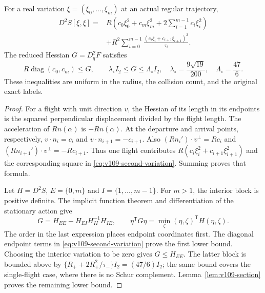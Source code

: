 \begin{lemma}
\label{lem:v109-hessian}
For a real variation $\xi=(\xi_0,\ldots,\xi_m)$ at an actual
regular trajectory,
\begin{equation}\label{eq:v109-second-variation}
 \begin{split}
 D^2S[\xi,\xi]={}&R\left(c_0\xi_0^2+c_m\xi_m^2
                   +2\sum_{i=1}^{m-1}c_i\xi_i^2\right)\\
 &+R^2\sum_{i=0}^{m-1}
                 \frac{(c_i\xi_i+c_{i+1}\xi_{i+1})^2}{\tau_i}.
 \end{split}
\end{equation}
The reduced Hessian $G=D_q^2F$ satisfies
\begin{equation}\label{eq:v109-hessian-bounds}
 R\operatorname{diag}(c_0,c_m)\leq G,\qquad
 \lambda_\circ I_2\leq G\leq\Lambda_\circ I_2,
 \quad \lambda_\circ=\frac{9\sqrt{19}}{200},\quad
 \Lambda_\circ=\frac{47}{6}.
\end{equation}
These inequalities are uniform in the radius, the collision count,
and the original exact labels.
\end{lemma}
\begin{proof}
For a flight with unit direction $v$, the Hessian of its length in
its endpoints is the squared perpendicular displacement divided by
the flight length. The acceleration of $R n(\alpha)$ is $-R n(\alpha)$.
At the departure and arrival points, respectively,
$v\cdot n_i=c_i$ and $v\cdot n_{i+1}=-c_{i+1}$.
Also $(R n_i')\cdot v^\perp=Rc_i$ and
$(R n_{i+1}')\cdot v^\perp=-Rc_{i+1}$.
Thus one flight contributes
$R(c_i\xi_i^2+c_{i+1}\xi_{i+1}^2)$ and the corresponding
square in \eqref{eq:v109-second-variation}. Summing proves that formula.

Let $H=D^2S$, $E=\{0,m\}$ and $I=\{1,\ldots,m-1\}$.
For $m>1$, the interior block is positive definite. The implicit
function theorem and differentiation of the stationary action give
\begin{equation}\label{eq:v109-schur}
 G=H_{EE}-H_{EI}H_{II}^{-1}H_{IE},\qquad
 \eta^{\mathsf T}G\eta=
    \min_{\zeta}(\eta,\zeta)^{\mathsf T}H(\eta,\zeta).
\end{equation}
The order in the last expression places endpoint coordinates first.
The diagonal endpoint terms in \eqref{eq:v109-second-variation}
prove the first lower bound. Choosing the interior variation to be
zero gives $G\leq H_{EE}$. The latter block is bounded above by
$\{R_++2R_+^2/\tau_-\}I_2=(47/6)I_2$; the same bound covers the
single-flight case, where there is no Schur complement.
Lemma~\ref{lem:v109-section} proves the remaining lower bound.
\end{proof}

